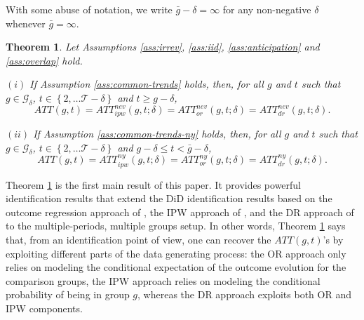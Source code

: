 \documentclass[11pt]{article}%
\theoremstyle{plain}
\newtheorem{theorem}{Theorem}
\numberwithin{sassumption}{section}
\numberwithin{equation}{section}
\begin{document}
With some abuse of notation,  we write $\bar{g} - \delta = \infty$ for any non-negative $\delta$ whenever $\bar{g} = \infty$.
\begin{theorem}
\label{thm:att} Let Assumptions \ref{ass:irrev}, \ref{ass:iid},
\ref{ass:anticipation} and \ref{ass:overlap} hold.

$\left(  i\right)  $ If Assumption \ref{ass:common-trends} holds, then, for
all $g$ and $t$ such that $g\in\mathcal{G}_{\delta}$, $t\in\left\{
2,\dots\mathcal{T-\delta}\right\}  $ and $ t \ge g-\delta$,%
\[
ATT\left(  g,t\right)  =ATT_{ipw}^{nev}\left(  g,t;\delta\right)
=ATT_{or}^{nev}\left(  g,t;\delta\right)  =ATT_{dr}^{nev}\left(
g,t;\delta\right)  .
\]


$\left(  ii\right)  $ If Assumption \ref{ass:common-trends-ny} holds, then,
for all $g$ and $t$ such that $g\in\mathcal{G}_{\delta}$, $t\in\left\{
2,\dots\mathcal{T-\delta}\right\}  $ and $ g-\delta \le t <\bar{g}-\delta$,
\[
ATT\left(  g,t\right)  =ATT_{ipw}^{ny}\left(  g,t;\delta\right)
=ATT_{or}^{ny}\left(  g,t;\delta\right)  =ATT_{dr}^{ny}\left(  g,t;\delta
\right)  .
\]

\end{theorem}

Theorem \ref{thm:att} is the first main result of this paper. It provides
powerful identification results that extend the DiD identification results
based on the outcome regression approach of \cite{Heckman1997, Heckman1998},
the IPW approach of \cite{Abadie2005}, and the DR approach of
\cite{SantAnna2020} to the multiple-periods, multiple groups setup. In other
words, Theorem \ref{thm:att} says that, from an identification point of view,
one can recover the $ATT\left(  g,t\right)  $'s by exploiting different parts
of the data generating process: the OR approach only relies on modeling the
conditional expectation of the outcome evolution for the comparison groups,
the IPW approach relies on modeling the conditional probability of being in group $g$,
whereas the DR approach exploits both OR and IPW components.
\end{document}
